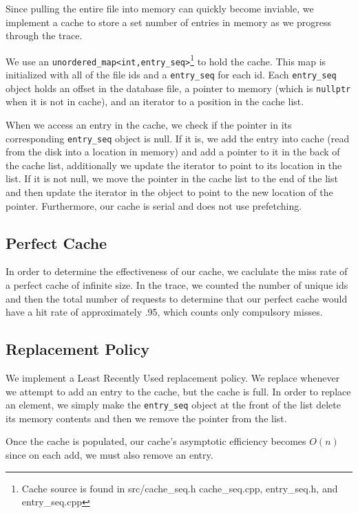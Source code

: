 \documentclass[notitlepage, twocolumn,11pt]{article}
\begin{document}
Since pulling the entire file into memory can quickly become inviable, we implement a cache to store a set number of entries in memory as we progress through the trace.

We use an \verb|unordered_map<int,entry_seq>|\footnote{Cache source is found in src/cache\_seq.h cache\_seq.cpp, entry\_seq.h, and entry\_seq.cpp} to hold the cache.
This map is initialized with all of the file ids and a \verb|entry_seq| for each id.
Each \verb|entry_seq| object holds an offset in the database file, a pointer to memory (which is \verb|nullptr| when it is not in cache), and an iterator to a position in the cache list.

When we access an entry in the cache, we check if the pointer in its corresponding \verb|entry_seq| object is null.
If it is, we add the entry into cache (read from the disk into a location in memory) and add a pointer to it in the back of the cache list, additionally we update the iterator to point to its location in the list.
If it is not null, we move the pointer in the cache list to the end of the list and then update the iterator in the object to point to the new location of the pointer.
Furthermore, our cache is serial and does not use prefetching.

\subsection{Perfect Cache}

In order to determine the effectiveness of our cache, we caclulate the miss rate of a perfect cache of infinite size.
In the trace, we counted the number of unique ids and then the total number of requests to determine that our perfect cache would have a hit rate of approximately .95, which counts only compulsory misses.

\subsection{Replacement Policy}

We implement a Least Recently Used replacement policy.
We replace whenever we attempt to add an entry to the cache, but the cache is full.
In order to replace an element, we simply make the \verb|entry_seq| object at the front of the list delete its memory contents and then we remove the pointer from the list.

Once the cache is populated, our cache's asymptotic efficiency becomes $O(n)$ since on each add, we must also remove an entry.
\end{document}

